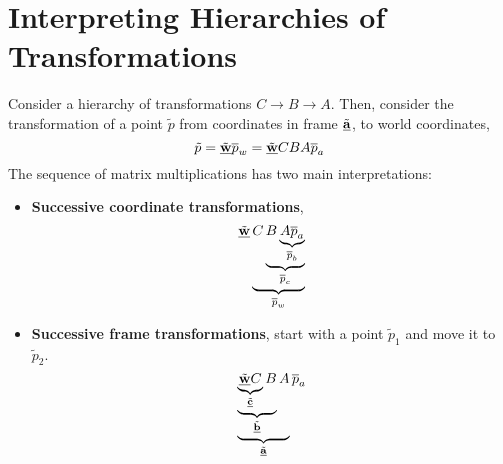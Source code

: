 \documentclass[letterpaper,12pt]{article}
\begin{document}
\section*{Interpreting Hierarchies of Transformations}
Consider a hierarchy of transformations $C \rightarrow B \rightarrow A$. Then, consider the transformation of a point $\tilde{p}$ from coordinates in frame $\tilde{\underline{\mathbf{a}}}$, to world coordinates,
\begin{equation*}
    \tilde{p} = \tilde{\underline{\mathbf{w}}} \overline{p}_w = \tilde{\underline{\mathbf{w}}} CBA \overline{p}_a
\end{equation*}
The sequence of matrix multiplications has two main interpretations:
\begin{itemize}
    \item \textbf{Successive coordinate transformations},
    \begin{equation*}
        \tilde{\underline{\mathbf{w}}} \underbrace{C \underbrace{B \underbrace{A \overline{p}_a}_{\overline{p}_b}}_{\overline{p}_c}}_{\overline{p}_w}
    \end{equation*}
    \item \textbf{Successive frame transformations}, start with a point $\tilde{p}_1$ and move it to $\tilde{p}_2$.
    \begin{equation*}
        \underbrace{\underbrace{\underbrace{\tilde{\underline{\mathbf{w}}} C}_{\tilde{\underline{\mathbf{c}}}} B}_{\tilde{\underline{\mathbf{b}}}} A}_{\tilde{\underline{\mathbf{a}}}} \overline{p}_a
    \end{equation*}
\end{itemize}
\end{document}
